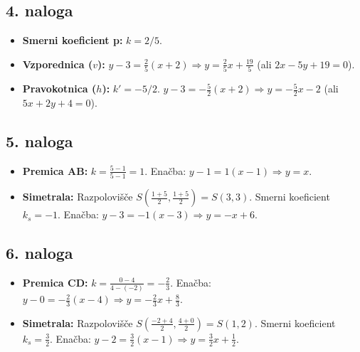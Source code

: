 \documentclass[12pt, a4paper]{article}
\begin{document}
\subsection*{4. naloga}
\begin{itemize}
    \item \textbf{Smerni koeficient p:} $k = 2/5$.
    \item \textbf{Vzporednica ($v$):} $y - 3 = \frac{2}{5}(x + 2) \Rightarrow y = \frac{2}{5}x + \frac{19}{5}$ (ali $2x - 5y + 19 = 0$).
    \item \textbf{Pravokotnica ($h$):} $k' = -5/2$. $y - 3 = -\frac{5}{2}(x + 2) \Rightarrow y = -\frac{5}{2}x - 2$ (ali $5x + 2y + 4 = 0$).
\end{itemize}

\subsection*{5. naloga}
\begin{itemize}
    \item \textbf{Premica AB:} $k = \frac{5-1}{5-1} = 1$. Enačba: $y - 1 = 1(x - 1) \Rightarrow y = x$.
    \item \textbf{Simetrala:} Razpolovišče $S(\frac{1+5}{2}, \frac{1+5}{2}) = S(3, 3)$. Smerni koeficient $k_s = -1$. Enačba: $y - 3 = -1(x - 3) \Rightarrow y = -x + 6$.
\end{itemize}

\subsection*{6. naloga}
\begin{itemize}
    \item \textbf{Premica CD:} $k = \frac{0-4}{4-(-2)} = -\frac{2}{3}$. Enačba: $y - 0 = -\frac{2}{3}(x - 4) \Rightarrow y = -\frac{2}{3}x + \frac{8}{3}$.
    \item \textbf{Simetrala:} Razpolovišče $S(\frac{-2+4}{2}, \frac{4+0}{2}) = S(1, 2)$. Smerni koeficient $k_s = \frac{3}{2}$. Enačba: $y - 2 = \frac{3}{2}(x - 1) \Rightarrow y = \frac{3}{2}x + \frac{1}{2}$.
\end{itemize}
\end{document}
